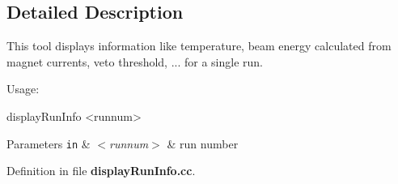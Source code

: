 \subsection{Detailed Description}
This tool displays information like temperature, beam energy calculated from magnet currents, veto threshold, ... for a single run.

Usage\-:


\begin{DoxyCode}
displayRunInfo <runnum>
\end{DoxyCode}



\begin{DoxyParams}[1]{Parameters}
\mbox{\tt in}  & {\em $<$runnum$>$} & run number \\
\hline
\end{DoxyParams}


Definition in file {\bf display\-Run\-Info.\-cc}.

